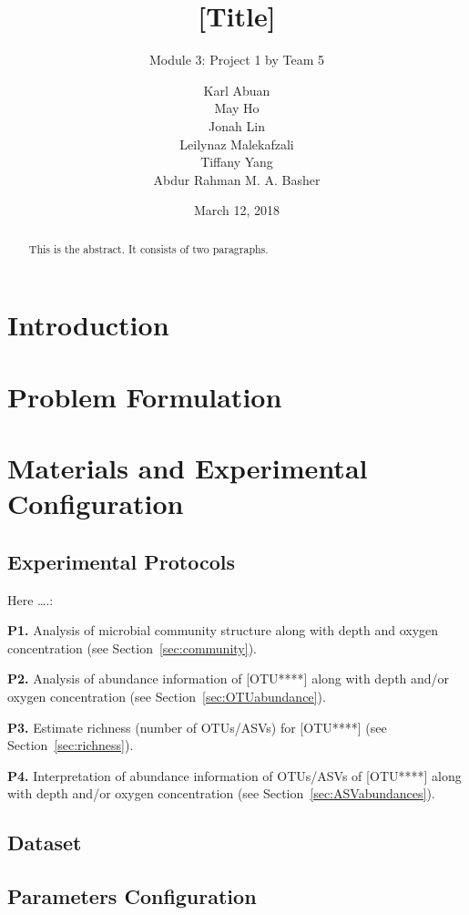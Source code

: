 \documentclass[11 pt,]{article}
\title{{[}Title{]}}
\subtitle{Module 3: Project 1 by Team 5}
\author{Karl Abuan \\ May Ho \\ Jonah Lin \\ Leilynaz Malekafzali \\ Tiffany Yang \\ Abdur Rahman M. A. Basher}
\date{March 12, 2018}
\newcommand*{\secref}[1]{Section~\ref{#1}}
\begin{document}
\maketitle
\begin{abstract}
This is the abstract. It consists of two paragraphs.
\end{abstract}

{
\hypersetup{linkcolor=black}
\setcounter{tocdepth}{3}
\tableofcontents
}
\section{Introduction}\label{introduction}

\section{Problem Formulation}\label{problem-formulation}

\section{Materials and Experimental
Configuration}\label{materials-and-experimental-configuration}

\subsection{Experimental Protocols}\label{experimental-protocols}

Here \ldots{}.:

\textbf{P1.} Analysis of microbial community structure along with depth
and oxygen concentration (see \secref{sec:community}).

\textbf{P2.} Analysis of abundance information of {[}OTU****{]} along
with depth and/or oxygen concentration (see \secref{sec:OTUabundance}).

\textbf{P3.} Estimate richness (number of OTUs/ASVs) for {[}OTU****{]}
(see \secref{sec:richness}).

\textbf{P4.} Interpretation of abundance information of OTUs/ASVs of
{[}OTU****{]} along with depth and/or oxygen concentration (see
\secref{sec:ASVabundances}).

\subsection{Dataset}\label{dataset}

\subsection{Parameters Configuration}\label{parameters-configuration}
\end{document}
